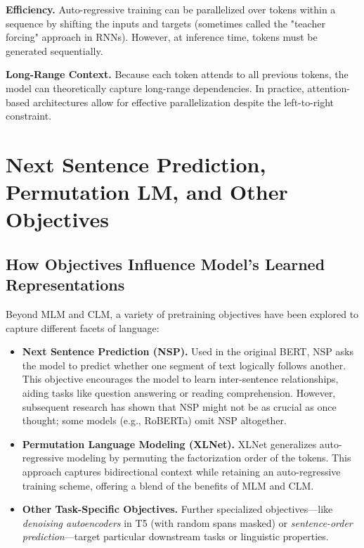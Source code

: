 \textbf{Efficiency.}
Auto-regressive training can be parallelized over tokens within a sequence by shifting the inputs and targets (sometimes called the "teacher forcing" approach in RNNs). However, at inference time, tokens must be generated sequentially.

\textbf{Long-Range Context.}
Because each token attends to all previous tokens, the model can theoretically capture long-range dependencies. In practice, attention-based architectures allow for effective parallelization despite the left-to-right constraint.

\section{Next Sentence Prediction, Permutation LM, and Other Objectives}
\label{sec:other_obj}

\subsection{How Objectives Influence Model's Learned Representations}
\noindent
Beyond MLM and CLM, a variety of pretraining objectives have been explored to capture different facets of language:

\begin{itemize}
    \item \textbf{Next Sentence Prediction (NSP).}
    Used in the original BERT, NSP asks the model to predict whether one segment of text logically follows another. This objective encourages the model to learn inter-sentence relationships, aiding tasks like question answering or reading comprehension. However, subsequent research has shown that NSP might not be as crucial as once thought; some models (e.g., RoBERTa) omit NSP altogether.
    
    \item \textbf{Permutation Language Modeling (XLNet).}
    XLNet generalizes auto-regressive modeling by permuting the factorization order of the tokens. This approach captures bidirectional context while retaining an auto-regressive training scheme, offering a blend of the benefits of MLM and CLM.
    
    \item \textbf{Other Task-Specific Objectives.}
    Further specialized objectives—like \emph{denoising autoencoders} in T5 (with random spans masked) or \emph{sentence-order prediction}—target particular downstream tasks or linguistic properties.
\end{itemize}

